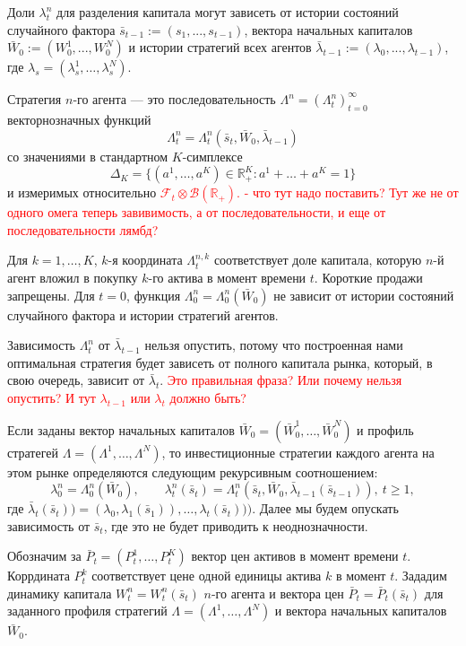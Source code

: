 \documentclass[a4paper,12pt,russian]{article} %
\theoremstyle{definition}
\newcommand{\F}{\mathcal{F}}
\newcommand{\R}{\mathbb{R}}
\begin{document}
Доли $\lambda_t^n$ для разделения капитала могут зависеть от истории состояний случайного фактора $\bar s_{t-1} := (s_1,...,s_{t-1})$,  вектора начальных капиталов $ \bar W_0 := (W_0^1,...,W_0^N)$ и истории стратегий всех агентов 
$\bar \lambda_{t-1} := ( \lambda_0,..., \lambda_{t-1})$, где $ \lambda_s = (\lambda^1_s, \dots, \lambda^N_s )$.

Стратегия $n$-го агента — это последовательность $\Lambda^n =
(\Lambda_t^n)_{t=0}^\infty$ векторнозначных функций 
\[
\Lambda_t^n =\Lambda_t^n(\bar s_{t},\bar W_0 , \bar \lambda_{t-1})
\]
со значениями в стандартном $K$-симплексе 
\[
\Delta_K
=\{ (a^1, \dots, a^K) \in \R^K_+ : a^1+\ldots+a^K = 1\}
\]
и измеримых относительно \textcolor{red} { {$\F_t\otimes \mathcal{B}(\R_+)$}.  - что тут надо поставить? Тут же не от одного омега теперь завивимость, а от последовательности, и еще от последовательности лямбд?} 

Для $k=1,\ldots,K$, $k$-я координата $\Lambda_t^{n,k}$ соответствует доле капитала, которую 
$n$-й агент вложил в покупку $k$-го актива в момент времени $t$. Короткие продажи запрещены.
Для $t=0$, функция $\Lambda_0^n = \Lambda_0^n(\bar W_0)$ не зависит от истории состояний случайного фактора и истории стратегий агентов.

Зависимость $\Lambda_t^n$ от  $\bar \lambda_{t-1}$ нельзя опустить, потому что построенная нами оптимальная стратегия будет зависеть от полного капитала рынка, который, в свою очередь, зависит от $\bar \lambda_{t}$. \textcolor{red} {Это правильная фраза? Или почему нельзя опустить? И тут $\lambda_{t-1}$ или $\lambda_t$ должно быть?}

Если заданы вектор начальных капиталов $\bar W_0=(\bar W_0^1,\ldots, \bar W_0^N)$ и профиль стратегей $\Lambda=(\Lambda^1,\dots,\Lambda^N)$, то инвестиционные стратегии каждого агента на этом рынке определяются следующим рекурсивным соотношением: 
\begin{equation}
\label{1-realization-of-strategy}
\lambda_0^n = \Lambda_0^n(\bar W_0), \qquad
\lambda_t^n(\bar s_{t}) = \Lambda_t^n( \bar s_{t}, \bar W_0, \bar \lambda_{t-1}( \bar s_{t-1})),\ t\ge 1,
\end{equation}
где  $ \bar \lambda_{t}( \bar s_{t})) = ( \lambda_0, \lambda_{1}(\bar s_{1})),\dots, \lambda_{t}(  \bar s_{t}) ))$.
Далее мы будем опускать зависимость от  $\bar s_{t}$, где это не будет приводить к неоднозначности.  


Обозначим за $\bar P_t = (P_{t}^1,\ldots,P_{t}^K)$ вектор цен активов в момент времени $t$.
Коррдината $P_{t}^k$  соответствует цене одной единицы актива $k$ в момент $t$.
Зададим динамику капитала $W_t^n = W_t^n(  \bar s_{t} )$ $n$-го агента и вектора цен $\bar P_t= \bar P_t( \bar s_{t} )$ для заданного профиля стратегий $\Lambda=(\Lambda^1,\dots,\Lambda^N)$ и вектора начальных капиталов $\bar W_0$.
\end{document}
